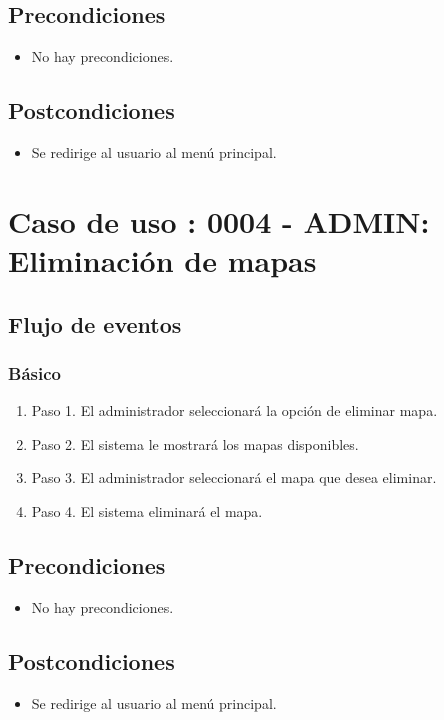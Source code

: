 \subsection{Precondiciones}
\begin{itemize}
\item No hay precondiciones.
\end{itemize}

\subsection{Postcondiciones}
\begin{itemize}
\item Se redirige al usuario al menú principal.
\end{itemize}


\section{Caso de uso : 0004 - ADMIN: Eliminación de mapas}\label{sec:uc0}
\subsection{Flujo de eventos}
\subsubsection{Básico}

\begin{enumerate}
\item Paso 1.
El administrador seleccionará la opción de eliminar mapa.
\item Paso 2.
El sistema le mostrará los mapas disponibles.
\item Paso 3.
El administrador seleccionará el mapa que desea eliminar.
\item Paso 4.
El sistema eliminará el mapa.
\end{enumerate}

\subsection{Precondiciones}
\begin{itemize}
\item No hay precondiciones.
\end{itemize}

\subsection{Postcondiciones}
\begin{itemize}
\item Se redirige al usuario al menú principal.
\end{itemize}



